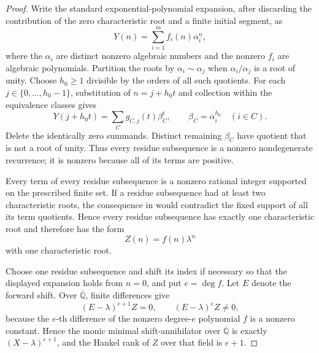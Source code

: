\begin{proof}
  Write the standard exponential-polynomial expansion, after discarding
  the contribution of the zero characteristic root and a finite initial
  segment, as
  \[
    Y(n)=\sum_{i=1}^m f_i(n)\alpha_i^n,
  \]
  where the \(\alpha_i\) are distinct nonzero algebraic numbers and the
  nonzero \(f_i\) are algebraic polynomials. Partition the roots by
  \(\alpha_i\sim\alpha_j\) when \(\alpha_i/\alpha_j\) is a root of
  unity. Choose \(h_0\ge1\) divisible by the orders of all such
  quotients. For each \(j\in\{0,\ldots,h_0-1\}\), substitution of
  \(n=j+h_0t\) and collection within the equivalence classes gives
  \[
    Y(j+h_0t)=\sum_C g_{C,j}(t)\beta_C^t,
    \qquad \beta_C=\alpha_i^{h_0}\quad(i\in C).
  \]
  Delete the identically zero summands. Distinct remaining \(\beta_C\)
  have quotient that is not a root of unity. Thus every residue
  subsequence is a nonzero nondegenerate recurrence; it is nonzero
  because all of its terms are positive.

  Every term of every residue subsequence is a nonzero rational integer
  supported on the prescribed finite set. If a residue subsequence had
  at least two characteristic roots, the consequence in
   would contradict the fixed
  support of all its term quotients. Hence every residue subsequence has
  exactly one characteristic root and therefore has the form
  \[
    Z(n)=f(n)\lambda^n
  \]
  with one characteristic root.

  Choose one residue subsequence and shift its index if necessary so
  that the displayed expansion holds from \(n=0\), and put
  \(e=\deg f\). Let \(E\) denote the forward shift. Over
  \(\overline{\mathbb Q}\), finite differences give
  \[
    (E-\lambda)^{e+1}Z=0,
    \qquad (E-\lambda)^eZ\ne0,
  \]
  because the \(e\)-th difference of the nonzero degree-\(e\) polynomial
  \(f\) is a nonzero constant. Hence the monic minimal shift-annihilator
  over \(\overline{\mathbb Q}\) is exactly
  \((X-\lambda)^{e+1}\), and the Hankel rank of \(Z\) over that field is
  \(e+1\).


\end{proof}
